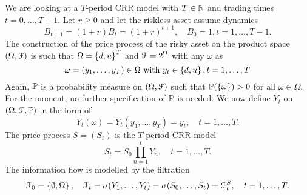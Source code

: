 \documentclass[12pt]{amsart}
\begin{document}
We are looking at a \(T\)-period CRR model with \(T \in \N\) and trading times \(t=0, \dots, T-1\). Let \(r \geq 0\) and let the riskless asset assume dynamics \[
    B_{t+1} = (1+r) B_t = (1+r)^{t+1},\quad B_0=1, t = 1, \dots, T-1.
\]
The construction of the price process of the risky asset on the product space \((\Omega, \cF)\) is such that \(\Omega = \set{d,u}^T\) and \(\cF = 2^\Omega\) with any \(\omega\) as \[
    \omega = (y_1, \dots, y_T) \in \Omega \text{ with } y_t \in \set{d, u}, t = 1, \dots, T
\]
Again, \(\P\) is a probability measure on \((\Omega, \cF)\) such that \(\P(\set{\omega}) > 0\) for all \(\omega \in \Omega\).
For the moment, no further specification of \(\P\) is needed. We now define \(Y_t\) on \((\Omega, \cF, \P)\) in the form of \[
    Y_t(\omega) = Y_t(y_1, \dots, y_T) = y_t, \quad t=1, \dots, T.
\]
The price process \(S=(S_t)\) is the \(T\)-period CRR model \[
    S_t = S_0 \prod_{n=1}^t Y_n, \quad t=1, \dots, T.
\]
The information flow is modelled by the filtration \[
    \cF_0 = \set{\emptyset, \Omega}, \quad \cF_t = \sigma(Y_1, \dots, Y_t) = \sigma(S_0, \dots, S_t) = \cF_t^S, \quad t=1, \dots, T.
\]
\end{document}
